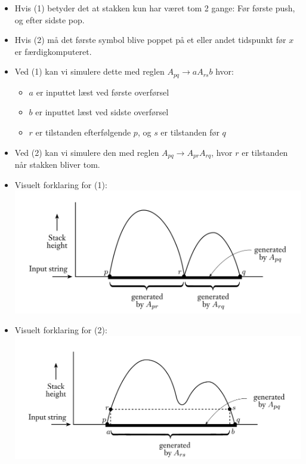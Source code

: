\begin{frame}[allowframebreaks]
\begin{itemize}
		\item Hvis (1) betyder det at stakken kun har været tom 2 gange: Før første push, og efter sidste pop.
		\item Hvis (2) må det første symbol blive poppet på et eller andet tidspunkt før $x$ er færdigkomputeret.
		\item Ved (1) kan vi simulere dette med reglen $A_{pq} \rightarrow aA_{rs}b$ hvor:
		      \begin{itemize}
			      \item $a$ er inputtet læst ved første overførsel
			      \item $b$ er inputtet læst ved sidste overførsel
			      \item $r$ er tilstanden efterfølgende $p$, og $s$ er tilstanden før $q$
		      \end{itemize}
		\item Ved (2) kan vi simulere den med reglen $A_{pq} \rightarrow A_{pr}A_{rq}$, hvor $r$ er tilstanden når stakken bliver tom.

		\item Visuelt forklaring for (1): \includegraphics[scale=0.3]{figur/figur228.png}
		\item Visuelt forklaring for (2): \includegraphics[scale=0.3]{figur/figur229.png}


\end{itemize}
\end{frame}
